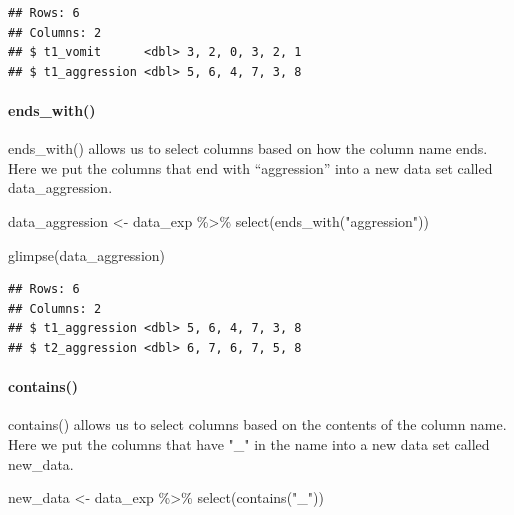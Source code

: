 \documentclass[
]{krantz}
\makeatletter
\newenvironment{Shaded}{\begin{snugshade}}{\end{snugshade}}
\newcommand{\FunctionTok}[1]{\textcolor[rgb]{0,0,0}{#1}}
\newcommand{\NormalTok}[1]{#1}
\newcommand{\OtherTok}[1]{\textcolor[rgb]{0.37,0.37,0.37}{#1}}
\newcommand{\SpecialCharTok}[1]{\textcolor[rgb]{0,0,0}{#1}}
\newcommand{\StringTok}[1]{\textcolor[rgb]{0.5,0.5,0.5}{#1}}
\newenvironment{kframe}{%
\medskip{}
\setlength{\fboxsep}{.8em}
 \def\at@end@of@kframe{}%
 \ifinner\ifhmode%
  \def\at@end@of@kframe{\end{minipage}}%
  \begin{minipage}{\columnwidth}%
 \fi\fi%
 \def\FrameCommand##1{\hskip\@totalleftmargin \hskip-\fboxsep
 \colorbox{shadecolor}{##1}\hskip-\fboxsep
     \hskip-\linewidth \hskip-\@totalleftmargin \hskip\columnwidth}%
 \MakeFramed {\advance\hsize-\width
   \@totalleftmargin\z@ \linewidth\hsize
   \@setminipage}}%
 {\par\unskip\endMakeFramed%
 \at@end@of@kframe}
\renewenvironment{Shaded}{\begin{kframe}}{\end{kframe}}
\makeatother
\begin{document}
\begin{verbatim}
## Rows: 6
## Columns: 2
## $ t1_vomit      <dbl> 3, 2, 0, 3, 2, 1
## $ t1_aggression <dbl> 5, 6, 4, 7, 3, 8
\end{verbatim}

\hypertarget{ends_with}{%
\paragraph{ends\_with()}\label{ends_with}}

ends\_with() allows us to select columns based on how the column name ends. Here we put the columns that end with ``aggression'' into a new data set called data\_aggression.

\begin{Shaded}
\begin{Highlighting}[]
\NormalTok{data\_aggression }\OtherTok{\textless{}{-}}\NormalTok{ data\_exp }\SpecialCharTok{\%\textgreater{}\%} 
  \FunctionTok{select}\NormalTok{(}\FunctionTok{ends\_with}\NormalTok{(}\StringTok{"aggression"}\NormalTok{))}
\end{Highlighting}
\end{Shaded}

\begin{Shaded}
\begin{Highlighting}[]
\FunctionTok{glimpse}\NormalTok{(data\_aggression)}
\end{Highlighting}
\end{Shaded}

\begin{verbatim}
## Rows: 6
## Columns: 2
## $ t1_aggression <dbl> 5, 6, 4, 7, 3, 8
## $ t2_aggression <dbl> 6, 7, 6, 7, 5, 8
\end{verbatim}

\hypertarget{contains}{%
\paragraph{contains()}\label{contains}}

contains() allows us to select columns based on the contents of the column name. Here we put the columns that have "\_" in the name into a new data set called new\_data.

\begin{Shaded}
\begin{Highlighting}[]
\NormalTok{new\_data }\OtherTok{\textless{}{-}}\NormalTok{ data\_exp }\SpecialCharTok{\%\textgreater{}\%} 
  \FunctionTok{select}\NormalTok{(}\FunctionTok{contains}\NormalTok{(}\StringTok{"\_"}\NormalTok{))}
\end{Highlighting}
\end{Shaded}
\end{document}

